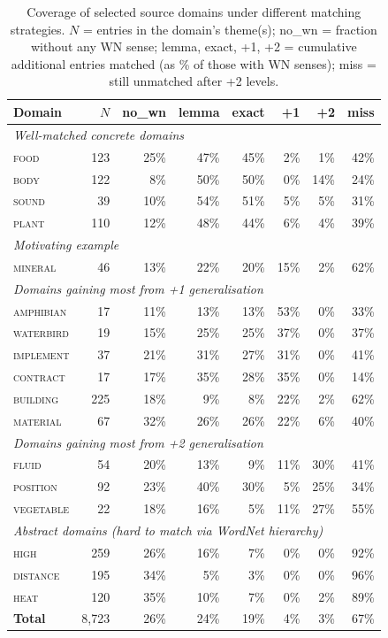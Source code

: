 \documentclass[11pt,a4paper]{article}
\begin{document}
\begin{table}[ht]
\centering
\small
\caption{Coverage of selected source domains under different matching
strategies.  $N$ = entries in the domain's theme(s); no\_wn = fraction
without any WN sense; lemma, exact, +1, +2 = cumulative additional
entries matched (as \% of those with WN senses); miss = still unmatched
after +2 levels.}
\label{tab:domaincoverage}
\begin{tabular}{lrrrrrrr}
\toprule
Domain & $N$ & no\_wn & lemma & exact & +1 & +2 & miss \\
\midrule
\multicolumn{8}{l}{\textit{Well-matched concrete domains}} \\
\textsc{food}       & 123 & 25\% & 47\% & 45\% &  2\% &  1\% & 42\% \\
\textsc{body}       & 122 &  8\% & 50\% & 50\% &  0\% & 14\% & 24\% \\
\textsc{sound}      &  39 & 10\% & 54\% & 51\% &  5\% &  5\% & 31\% \\
\textsc{plant}      & 110 & 12\% & 48\% & 44\% &  6\% &  4\% & 39\% \\
\midrule
\multicolumn{8}{l}{\textit{Motivating example}} \\
\textsc{mineral}    &  46 & 13\% & 22\% & 20\% & 15\% &  2\% & 62\% \\
\midrule
\multicolumn{8}{l}{\textit{Domains gaining most from +1 generalisation}} \\
\textsc{amphibian}  &  17 & 11\% & 13\% & 13\% & 53\% &  0\% & 33\% \\
\textsc{waterbird}  &  19 & 15\% & 25\% & 25\% & 37\% &  0\% & 37\% \\
\textsc{implement}  &  37 & 21\% & 31\% & 27\% & 31\% &  0\% & 41\% \\
\textsc{contract}   &  17 & 17\% & 35\% & 28\% & 35\% & 0\% & 14\% \\
\textsc{building}   & 225 & 18\% &  9\% &  8\% & 22\% &  2\% & 62\% \\
\textsc{material}   &  67 & 32\% & 26\% & 26\% & 22\% &  6\% & 40\% \\
\midrule
\multicolumn{8}{l}{\textit{Domains gaining most from +2 generalisation}} \\
\textsc{fluid}      &  54 & 20\% & 13\% &  9\% & 11\% & 30\% & 41\% \\
\textsc{position}   &  92 & 23\% & 40\% & 30\% &  5\% & 25\% & 34\% \\
\textsc{vegetable}  &  22 & 18\% & 16\% &  5\% & 11\% & 27\% & 55\% \\
\midrule
\multicolumn{8}{l}{\textit{Abstract domains (hard to match via WordNet hierarchy)}} \\
\textsc{high}       & 259 & 26\% & 16\% &  7\% &  0\% &  0\% & 92\% \\
\textsc{distance}   & 195 & 34\% &  5\% &  3\% &  0\% &  0\% & 96\% \\
\textsc{heat}       & 120 & 35\% & 10\% &  7\% &  0\% &  2\% & 89\% \\
\midrule
\textbf{Total}      & 8,723 & 26\% & 24\% & 19\% &  4\% &  3\% & 67\% \\
\bottomrule
\end{tabular}
\end{table}
\end{document}
